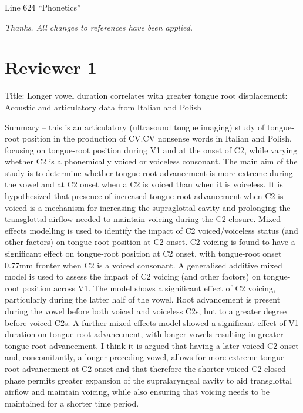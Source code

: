 \documentclass[]{article}
\begin{document}
Line 624 ``Phonetics''

\begin{adjustwidth}{1cm}{} \textit{
Thanks. All changes to references have been applied.
} \end{adjustwidth}

\hypertarget{reviewer-1}{%
\section{Reviewer 1}\label{reviewer-1}}

Title: Longer vowel duration correlates with greater tongue root
displacement: Acoustic and articulatory data from Italian and Polish

Summary -- this is an articulatory (ultrasound tongue imaging) study of
tongue-root position in the production of CV.CV nonsense words in
Italian and Polish, focusing on tongue-root position during V1 and at
the onset of C2, while varying whether C2 is a phonemically voiced or
voiceless consonant. The main aim of the study is to determine whether
tongue root advancement is more extreme during the vowel and at C2 onset
when a C2 is voiced than when it is voiceless. It is hypothesized that
presence of increased tongue-root advancement when C2 is voiced is a
mechanism for increasing the supraglottal cavity and prolonging the
transglottal airflow needed to maintain voicing during the C2 closure.
Mixed effects modelling is used to identify the impact of C2
voiced/voiceless status (and other factors) on tongue root position at
C2 onset. C2 voicing is found to have a significant effect on
tongue-root position at C2 onset, with tongue-root onset 0.77mm fronter
when C2 is a voiced consonant. A generalised additive mixed model is
used to assess the impact of C2 voicing (and other factors) on
tongue-root position across V1. The model shows a significant effect of
C2 voicing, particularly during the latter half of the vowel. Root
advancement is present during the vowel before both voiced and voiceless
C2s, but to a greater degree before voiced C2s. A further mixed effects
model showed a significant effect of V1 duration on tongue-root
advancement, with longer vowels resulting in greater tongue-root
advancement. I think it is argued that having a later voiced C2 onset
and, concomitantly, a longer preceding vowel, allows for more extreme
tongue-root advancement at C2 onset and that therefore the shorter
voiced C2 closed phase permits greater expansion of the supralaryngeal
cavity to aid transglottal airflow and maintain voicing, while also
ensuring that voicing needs to be maintained for a shorter time period.
\end{document}
